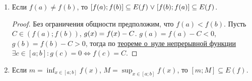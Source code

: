 \begin{enumerate}
	\item \begin{theorem}
	Если $f(a) \neq f(b)$, то $[f(a); f(b)] \opbr\subseteq E(f) \opbr\lOr [f(b); f(a)] \opbr\subseteq E(f)$.
	\end{theorem}
	\begin{proof}
	Без ограничения общности предположим, что $f(a) < f(b)$.
	Пусть $C \in (f(a); f(b))$, $g(x) \opbr= f(x) - C$.
	$g(a) = f(a) - C < 0$, $g(b) = f(b) - C > 0$, тогда по \hyperref[th:zero_of_continuous_function]{теореме о~нуле непрерывной функции} $\exists c \in [a; b] \colon \allowbreak g(c) = 0 \Leftrightarrow f(c) = C$.
	\end{proof}
	
	\item Если $\displaystyle m = \inf_{x \in [a; b]} f(x)$, $\displaystyle M = \sup_{x \in [a; b]} f(x)$, то $[m; M] \subseteq E(f)$.
\end{enumerate}